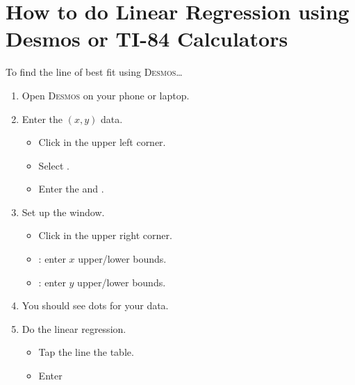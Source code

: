 \section*{How to do Linear Regression using Desmos or TI-84 Calculators}
\small
\begin{minipage}[t]{0.5\textwidth}
\begin{myConcept}{To find the line of best fit using {\scshape Desmos}\dots}
    \begin{enumerate}
        \item Open {\scshape Desmos} on your phone or laptop.
        \item Enter the $(x,y)$ data.
            \begin{itemize}
                \item Click 
                    in the upper left corner.
                \item Select .
                \item Enter the  and .
            \end{itemize}
        \item Set up the window.
            \begin{itemize}
                \item Click 
                    in the upper right corner.
                \item {}: enter $x$ upper/lower bounds.
                \item {}: enter $y$ upper/lower bounds.
            \end{itemize}
        \item You should see dots for your data.
        \item Do the linear regression.
            \begin{itemize}
                \item Tap the line  the table.
                \item Enter 

\end{itemize}
\end{enumerate}
\end{myConcept}
\end{minipage}
